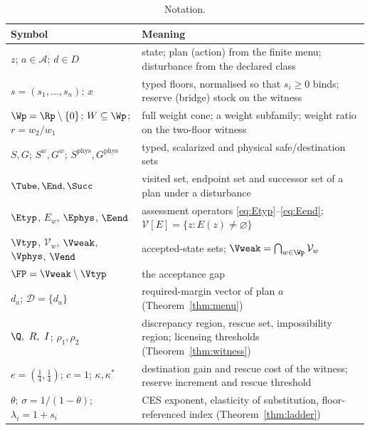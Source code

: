 \begin{table}[!htbp]
\centering\small
\caption{Notation.}
\label{tab:notation}
\begin{tabularx}{\textwidth}{@{}>{\raggedright\arraybackslash}p{}X@{}}
\toprule
Symbol & Meaning \\
\midrule
$z$; $a\in\mathcal A$; $d\in D$ & state; plan (action) from the finite menu; disturbance from the declared class \\
$s=(s_1,\dots,s_n)$; $x$ & typed floors, normalised so that $s_i\ge0$ binds; reserve (bridge) stock on the witness \\
$\Wp=\Rp\setminus\{0\}$; $W\subseteq\Wp$; $r=w_2/w_1$ & full weight cone; a weight subfamily; weight ratio on the two-floor witness \\
$S,G$; $S^w,G^w$; $S^{\mathrm{phys}},G^{\mathrm{phys}}$ & typed, scalarized and physical safe/destination sets \\
$\Tube,\End,\Succ$ & visited set, endpoint set and successor set of a plan under a disturbance \\
$\Etyp$, $E_w$, $\Ephys$, $\Eend$ & assessment operators \eqref{eq:Etyp}--\eqref{eq:Eend}; $\mathcal V[E]=\{z:E(z)\ne\varnothing\}$ \\
$\Vtyp$, $\mathcal V_w$, $\Vweak$, $\Vphys$, $\Vend$ & accepted-state sets; $\Vweak=\bigcap_{w\in\Wp}\mathcal V_w$ \\
$\FP=\Vweak\setminus\Vtyp$ & the acceptance gap \\
$d_a$; $\mathcal D=\{d_a\}$ & required-margin vector of plan $a$ (Theorem~\ref{thm:menu}) \\
$\Q,\ R,\ I$; $\rho_1,\rho_2$ & discrepancy region, rescue set, impossibility region; licensing thresholds (Theorem~\ref{thm:witness}) \\
$e=(\tfrac14,\tfrac14)$; $c=1$; $\kappa,\kappa^*$ & destination gain and rescue cost of the witness; reserve increment and rescue threshold \\
$\theta$; $\sigma=1/(1-\theta)$; $\lambda_i=1+s_i$ & CES exponent, elasticity of substitution, floor-referenced index (Theorem~\ref{thm:ladder}) \\
\bottomrule
\end{tabularx}
\end{table}

